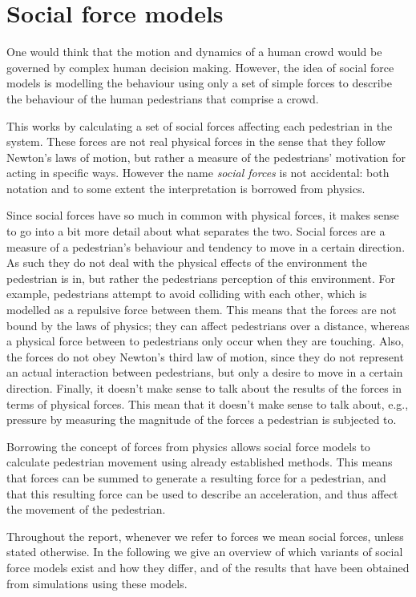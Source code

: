 \section{Social force models}
\label{sec:social-forces}
One would think that the motion and dynamics of a human crowd would be
governed by complex human decision making. However, the idea of social force
models is modelling the behaviour using only a set of simple forces to
describe the behaviour of the human pedestrians that comprise a crowd.

This works by calculating a set of social forces affecting each pedestrian in 
the system.  These forces are not real physical forces in the sense that they 
follow Newton's laws of motion, but rather a measure of the  pedestrians' 
motivation for acting in specific ways. However the name \emph{social forces}
is not accidental: both notation and to some extent the interpretation is
borrowed from physics.

Since social forces have so much in common with physical forces, it makes
sense to go into a bit more detail about what separates the two. Social forces 
are a measure of a pedestrian's behaviour and tendency to move in a certain 
direction. As such they do not deal with the physical effects of the 
environment the pedestrian is in, but rather the pedestrians perception of 
this environment. For example, pedestrians attempt to avoid colliding with each 
other, which is modelled as a repulsive force between them. This means that 
the forces are not bound by the laws of physics; they can affect pedestrians 
over a distance, whereas a physical force between to pedestrians only occur 
when they are touching. Also, the forces do not obey Newton's third law of 
motion, since they do not represent an actual interaction between pedestrians, 
but only a desire to move in a certain direction. Finally, it doesn't make 
sense to talk about the results of the forces in terms of physical forces. 
This mean that it doesn't make sense to talk about, e.g., pressure by 
measuring the magnitude of the forces a pedestrian is subjected to.

Borrowing the concept of forces from physics allows social force models to 
calculate pedestrian movement using already established methods. This means 
that forces can be summed to generate a resulting force for a pedestrian, and 
that this resulting force can be used to describe an acceleration, and thus 
affect the movement of the pedestrian.

Throughout the report, whenever we refer to forces we mean social forces, 
unless stated otherwise. In the following we give an overview of which 
variants of social force models exist and how they differ, and of the results 
that have been obtained from simulations using these models.

